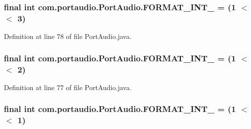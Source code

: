 \subsubsection[{\texorpdfstring{F\+O\+R\+M\+A\+T\+\_\+\+I\+N\+T\+\_\+16}{FORMAT_INT_16}}]{\setlength{\rightskip}{0pt plus 5cm}final {\bf int} com.\+portaudio.\+Port\+Audio.\+F\+O\+R\+M\+A\+T\+\_\+\+I\+N\+T\+\_ = (1 $<$$<$ 3)\hspace{0.3cm}{\ttfamily [static]}}\hypertarget{classcom_1_1portaudio_1_1_port_audio_a038b2ecc4e7aff2cd9159d6c1acb2f17}{}\label{classcom_1_1portaudio_1_1_port_audio_a038b2ecc4e7aff2cd9159d6c1acb2f17}


Definition at line 78 of file Port\+Audio.\+java.

\subsubsection[{\texorpdfstring{F\+O\+R\+M\+A\+T\+\_\+\+I\+N\+T\+\_\+24}{FORMAT_INT_24}}]{\setlength{\rightskip}{0pt plus 5cm}final {\bf int} com.\+portaudio.\+Port\+Audio.\+F\+O\+R\+M\+A\+T\+\_\+\+I\+N\+T\+\_ = (1 $<$$<$ 2)\hspace{0.3cm}{\ttfamily [static]}}\hypertarget{classcom_1_1portaudio_1_1_port_audio_a7a63350a8781554741a49c72753551dd}{}\label{classcom_1_1portaudio_1_1_port_audio_a7a63350a8781554741a49c72753551dd}


Definition at line 77 of file Port\+Audio.\+java.

\subsubsection[{\texorpdfstring{F\+O\+R\+M\+A\+T\+\_\+\+I\+N\+T\+\_\+32}{FORMAT_INT_32}}]{\setlength{\rightskip}{0pt plus 5cm}final {\bf int} com.\+portaudio.\+Port\+Audio.\+F\+O\+R\+M\+A\+T\+\_\+\+I\+N\+T\+\_ = (1 $<$$<$ 1)\hspace{0.3cm}{\ttfamily [static]}}\hypertarget{classcom_1_1portaudio_1_1_port_audio_ae9b9140287ddfa452a78a90762b8e2c2}{}\label{classcom_1_1portaudio_1_1_port_audio_ae9b9140287ddfa452a78a90762b8e2c2}


